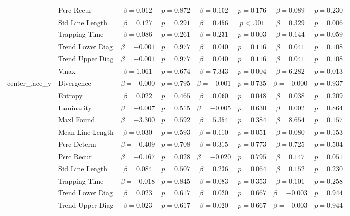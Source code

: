 \begin{tabular}{llcc|cc|cc}
 & Perc Recur & $\beta = 0.012$ & $p = 0.872$ & $\beta = 0.102$ & $p = 0.176$ & $\beta = 0.089$ & $p = 0.230$ \\
 & Std Line Length & $\beta = 0.127$ & $p = 0.291$ & $\beta = 0.456$ & $p < .001$ & $\beta = 0.329$ & $p = 0.006$ \\
 & Trapping Time & $\beta = 0.086$ & $p = 0.261$ & $\beta = 0.231$ & $p = 0.003$ & $\beta = 0.144$ & $p = 0.059$ \\
 & Trend Lower Diag & $\beta = -0.001$ & $p = 0.977$ & $\beta = 0.040$ & $p = 0.116$ & $\beta = 0.041$ & $p = 0.108$ \\
 & Trend Upper Diag & $\beta = -0.001$ & $p = 0.977$ & $\beta = 0.040$ & $p = 0.116$ & $\beta = 0.041$ & $p = 0.108$ \\
 & Vmax & $\beta = 1.061$ & $p = 0.674$ & $\beta = 7.343$ & $p = 0.004$ & $\beta = 6.282$ & $p = 0.013$ \\
\midrule
\multirow{12}{*}{center_face_y} & Divergence & $\beta = -0.000$ & $p = 0.795$ & $\beta = -0.001$ & $p = 0.735$ & $\beta = -0.000$ & $p = 0.937$ \\
 & Entropy & $\beta = 0.022$ & $p = 0.465$ & $\beta = 0.060$ & $p = 0.048$ & $\beta = 0.038$ & $p = 0.209$ \\
 & Laminarity & $\beta = -0.007$ & $p = 0.515$ & $\beta = -0.005$ & $p = 0.630$ & $\beta = 0.002$ & $p = 0.864$ \\
 & Maxl Found & $\beta = -3.300$ & $p = 0.592$ & $\beta = 5.354$ & $p = 0.384$ & $\beta = 8.654$ & $p = 0.157$ \\
 & Mean Line Length & $\beta = 0.030$ & $p = 0.593$ & $\beta = 0.110$ & $p = 0.051$ & $\beta = 0.080$ & $p = 0.153$ \\
 & Perc Determ & $\beta = -0.409$ & $p = 0.708$ & $\beta = 0.315$ & $p = 0.773$ & $\beta = 0.725$ & $p = 0.504$ \\
 & Perc Recur & $\beta = -0.167$ & $p = 0.028$ & $\beta = -0.020$ & $p = 0.795$ & $\beta = 0.147$ & $p = 0.051$ \\
 & Std Line Length & $\beta = 0.084$ & $p = 0.507$ & $\beta = 0.236$ & $p = 0.064$ & $\beta = 0.152$ & $p = 0.230$ \\
 & Trapping Time & $\beta = -0.018$ & $p = 0.845$ & $\beta = 0.083$ & $p = 0.353$ & $\beta = 0.101$ & $p = 0.258$ \\
 & Trend Lower Diag & $\beta = 0.023$ & $p = 0.617$ & $\beta = 0.020$ & $p = 0.667$ & $\beta = -0.003$ & $p = 0.944$ \\
 & Trend Upper Diag & $\beta = 0.023$ & $p = 0.617$ & $\beta = 0.020$ & $p = 0.667$ & $\beta = -0.003$ & $p = 0.944$ \\

\end{tabular}
